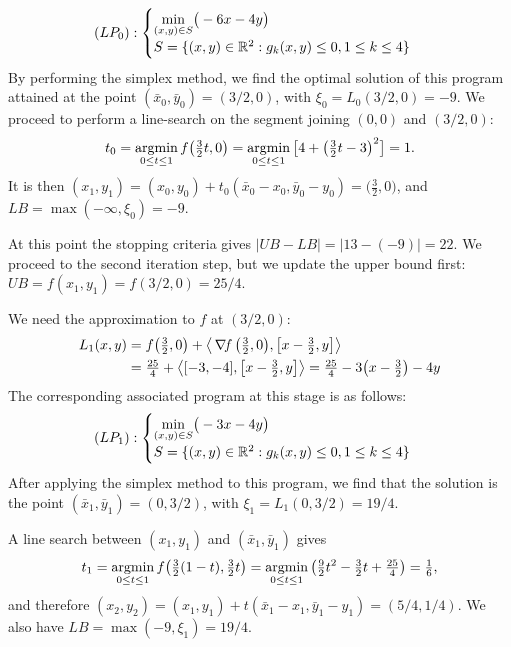 \begin{example}
\begin{equation*}
(LP_0): \begin{cases} \displaystyle{\min_{(x,y) \in S}} \big( -6x-4y \big) \\ S = \{ (x,y) \in \mathbb{R}^2 : g_k(x,y) \leq 0, 1 \leq k \leq 4 \} \end{cases}
\end{equation*}
By performing the simplex method, we find the optimal solution of this program attained at the point $(\bar{x}_0, \bar{y}_0) = (3/2,0)$, with $\xi_0 = L_0(3/2,0) = -9$. We proceed to perform a line-search on the segment joining $(0,0)$ and $(3/2,0)$:
\begin{equation*}
t_0 = \operatorname*{argmin}_{0 \leq t \leq 1} f\big(\tfrac{3}{2}t, 0 \big) = \operatorname*{argmin}_{0 \leq t \leq 1} \big[ 4 + \big(\tfrac{3}{2}t-3 \big)^2 \big] = 1.
\end{equation*}
It is then $(x_1,y_1)=(x_0,y_0)+t_0(\bar{x}_0-x_0, \bar{y}_0 - y_0) = \big( \tfrac{3}{2}, 0 \big)$, and $LB=\max(-\infty, \xi_0)=-9$.

At this point the stopping criteria gives $\lvert UB - LB \rvert = \lvert 13-(-9) \rvert = 22$.  We proceed to the second iteration step, but we update the upper bound first: $UB=f(x_1,y_1)=f(3/2,0)=25/4$.

We need the approximation to $f$ at $(3/2,0)$: 
\begin{align*}
L_1(x,y) &= f\big( \tfrac{3}{2} ,0\big) + \big\langle \mathop{\nabla\! {f}}\big( \tfrac{3}{2},0 \big), \big[ x-\tfrac{3}{2}, y \big] \big\rangle \\
&= \tfrac{25}{4} + \big\langle [-3,-4], \big[ x-\tfrac{3}{2}, y \big] \big\rangle = \tfrac{25}{4} - 3\big( x-\tfrac{3}{2} \big) - 4y
\end{align*}
The corresponding associated program at this stage is as follows:
\begin{equation*}
(LP_1): \begin{cases} 
\displaystyle{\min_{(x,y) \in S}} \big( -3x-4y \big) \\
S = \{ (x,y) \in \mathbb{R}^2 : g_k(x,y) \leq 0, 1 \leq k \leq 4 \}
\end{cases}
\end{equation*}
After applying the simplex method to this program, we find that the solution is the point $(\bar{x}_1, \bar{y}_1) = (0,3/2)$, with $\xi_1 = L_1(0,3/2) = 19/4$.

A line search between $(x_1,y_1)$ and $(\bar{x}_1, \bar{y}_1)$ gives
\begin{equation*}
t_1 = \operatorname*{argmin}_{0 \leq t \leq 1} f\big( \tfrac{3}{2}(1-t), \tfrac{3}{2}t \big) = \operatorname*{argmin}_{0 \leq t \leq 1} \big( \tfrac{9}{2}t^2 - \tfrac{3}{2}t + \tfrac{25}{4} \big) = \tfrac{1}{6},
\end{equation*}
and therefore $(x_2,y_2) = (x_1,y_1)+t(\bar{x}_1-x_1, \bar{y}_1-y_1) = (5/4, 1/4)$. We also have $LB = \max( -9, \xi_1 ) = 19/4$.  


\end{example}
